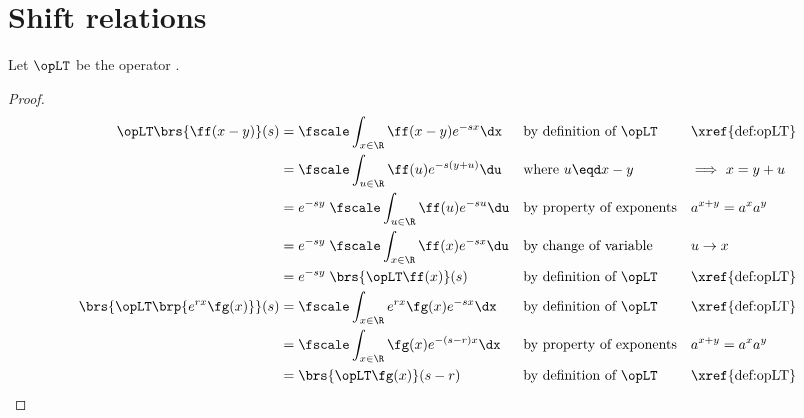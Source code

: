\section{Shift relations}
\begin{theorem}
\label{thm:opLT_shift}
Let $\opLT$ be the  operator .
\end{theorem}
\begin{proof}
\begin{align*}
  \opLT \brs{\ff(x-y)}(s)
    &= \fscale \int_{x\in\R} \ff(x-y) e^{-sx} \dx         && \text{by definition of $\opLT$} && \text{\xref{def:opLT}}
  \\&= \fscale \int_{u\in\R} \ff(u) e^{-s(y+u)} \du       && \text{where $u\eqd x-y$}        && \text{$\implies$ $x=y+u$}
  \\&= e^{-sy} \;\fscale \int_{u\in\R} \ff(u) e^{-su} \du && \text{by property of exponents} && \text{$a^{x+y}=a^xa^y$}
  \\&= e^{-sy} \;\fscale \int_{x\in\R} \ff(x) e^{-sx} \du && \text{by change of variable}    && \text{$u\to x$}
  \\&= e^{-sy} \;\brs{\opLT \ff(x)}(s)                    && \text{by definition of $\opLT$} && \text{\xref{def:opLT}}
  \\
  \brs{\opLT\brp{e^{rx} \fg(x)}}(s)
    &= \fscale \int_{x\in\R} e^{rx} \fg(x) e^{-sx} \dx    && \text{by definition of $\opLT$} && \text{\xref{def:opLT}}
  \\&= \fscale \int_{x\in\R} \fg(x) e^{-(s-r)x} \dx       && \text{by property of exponents} && \text{$a^{x+y} = a^x a^y$}
  \\&= \brs{\opLT\fg(x)}(s-r)                             && \text{by definition of $\opLT$} && \text{\xref{def:opLT}}
\end{align*}
\end{proof}

